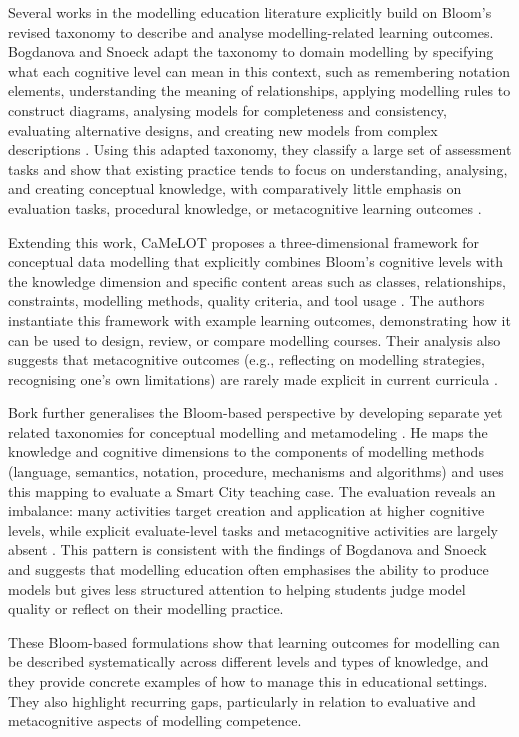 Several works in the modelling education literature explicitly build on Bloom's revised taxonomy to describe and analyse modelling-related learning outcomes. Bogdanova and Snoeck adapt the taxonomy to domain modelling by specifying what each cognitive level can mean in this context, such as remembering notation elements, understanding the meaning of relationships, applying modelling rules to construct diagrams, analysing models for completeness and consistency, evaluating alternative designs, and creating new models from complex descriptions \cite{bogdanova2017domain}. Using this adapted taxonomy, they classify a large set of assessment tasks and show that existing practice tends to focus on understanding, analysing, and creating conceptual knowledge, with comparatively little emphasis on evaluation tasks, procedural knowledge, or metacognitive learning outcomes \cite{bogdanova2017domain}.

Extending this work, CaMeLOT proposes a three-dimensional framework for conceptual data modelling that explicitly combines Bloom's cognitive levels with the knowledge dimension and specific content areas such as classes, relationships, constraints, modelling methods, quality criteria, and tool usage \cite{bogdanova2019camelot}. The authors instantiate this framework with example learning outcomes, demonstrating how it can be used to design, review, or compare modelling courses. Their analysis also suggests that metacognitive outcomes (e.g., reflecting on modelling strategies, recognising one's own limitations) are rarely made explicit in current curricula \cite{bogdanova2019camelot}.

Bork further generalises the Bloom-based perspective by developing separate yet related taxonomies for conceptual modelling and metamodeling \cite{bork2019framework}. He maps the knowledge and cognitive dimensions to the components of modelling methods (language, semantics, notation, procedure, mechanisms and algorithms) and uses this mapping to evaluate a Smart City teaching case. The evaluation reveals an imbalance: many activities target creation and application at higher cognitive levels, while explicit evaluate-level tasks and metacognitive activities are largely absent \cite{bork2019framework}. This pattern is consistent with the findings of Bogdanova and Snoeck and suggests that modelling education often emphasises the ability to produce models but gives less structured attention to helping students judge model quality or reflect on their modelling practice.

These Bloom-based formulations show that learning outcomes for modelling can be described systematically across different levels and types of knowledge, and they provide concrete examples of how to manage this in educational settings. They also highlight recurring gaps, particularly in relation to evaluative and metacognitive aspects of modelling competence.

